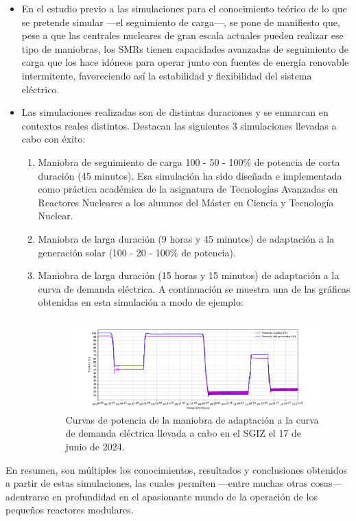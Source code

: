 \documentclass[a4paper, 11pt, spanish, twoside]{article}
\begin{document}
\begin{itemize}
    \item En el estudio previo a las simulaciones para el conocimiento teórico de lo que se pretende simular ---el seguimiento de carga---, se pone de manifiesto que, pese a que las centrales nucleares de gran escala actuales pueden realizar ese tipo de maniobras, los SMRs tienen capacidades avanzadas de seguimiento de carga que los hace idóneos para operar junto con fuentes de energía renovable intermitente, favoreciendo así la estabilidad y flexibilidad del sistema eléctrico.
    \item Las simulaciones realizadas son de distintas duraciones y se enmarcan en contextos reales distintos. Destacan las siguientes 3 simulaciones llevadas a cabo con éxito:
    \begin{enumerate}
        \item Maniobra de seguimiento de carga 100 - 50 - 100\% de potencia de corta duración (45 minutos). Esa simulación ha sido diseñada e implementada como práctica académica de la asignatura de Tecnologías Avanzadas en Reactores Nucleares a los alumnos del Máster en Ciencia y Tecnología Nuclear.
        \item Maniobra de larga duración (9 horas y 45 minutos) de adaptación a la generación solar (100 - 20 - 100\% de potencia).
        \item Maniobra de larga duración (15 horas y 15 minutos) de adaptación a la curva de demanda eléctrica. A continuación se muestra una de las gráficas obtenidas en esta simulación a modo de ejemplo:
        \begin{figure}[h!]
            \centering
            \includegraphics[width=\textwidth]{content/figures/sim4_potencias.pdf}
            \caption{Curvas de potencia de la maniobra de adaptación a la curva de demanda eléctrica llevada a cabo en el SGIZ el 17 de junio de 2024.}
            \label{fig:sim4_potencias}
            \vspace{-0.7cm}
        \end{figure}
    \end{enumerate}
\end{itemize}
En resumen, son múltiples los conocimientos, resultados y conclusiones obtenidos a partir de estas simulaciones, las cuales permiten ---entre muchas otras cosas--- adentrarse en profundidad en el apasionante mundo de la operación de los pequeños reactores modulares.
\end{document}
